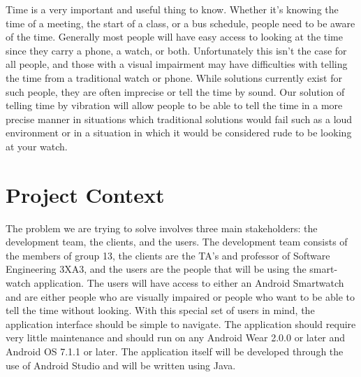 \documentclass{article}
\begin{document}
Time is a very important and useful thing to know. Whether it's knowing the time of a meeting, the start of a class, or a bus schedule, people need to be aware of the time. Generally most people will have easy access to looking at the time since they carry a phone, a watch, or both. Unfortunately this isn't the case for all people, and those with a visual impairment may have difficulties with telling the time from a traditional watch or phone. While solutions currently exist for such people, they are often imprecise or tell the time by sound. Our solution of telling time by vibration will allow people to be able to tell the time in a more precise manner in situations which traditional solutions would fail such as a loud environment or in a situation in which it would be considered rude to be looking at your watch.
\vspace{0.3cm}

\section{Project Context}
\vspace{0.3cm}

The problem we are trying to solve involves three main stakeholders: the development team, the clients, and the users. The development team consists of the members of group 13, the clients are the TA's and professor of Software Engineering 3XA3, and the users are the people that will be using the smart-watch application. The users will have access to either an Android Smartwatch and are either people who are visually impaired or people who want to be able to tell the time without looking. With this special set of users in mind, the application interface should be simple to navigate. The application should require very little maintenance and should run on any Android Wear 2.0.0 or later and Android OS 7.1.1 or later. The application itself will be developed through the use of Android Studio and will be written using Java.






\end{document}
